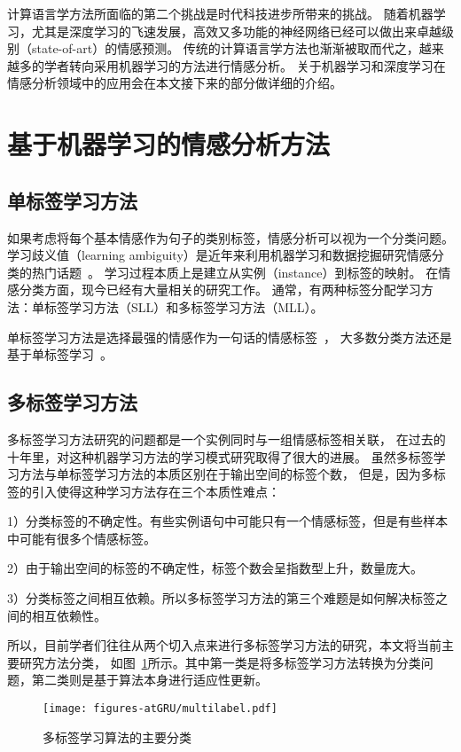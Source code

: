 计算语言学方法所面临的第二个挑战是时代科技进步所带来的挑战。
随着机器学习，尤其是深度学习的飞速发展，高效又多功能的神经网络已经可以做出来卓越级别（state-of-art）的情感预测。
传统的计算语言学方法也渐渐被取而代之，越来越多的学者转向采用机器学习的方法进行情感分析。
关于机器学习和深度学习在情感分析领域中的应用会在本文接下来的部分做详细的介绍。

\section{基于机器学习的情感分析方法}
\subsection{单标签学习方法}
如果考虑将每个基本情感作为句子的类别标签，情感分析可以视为一个分类问题。
学习歧义值（learning ambiguity）是近年来利用机器学习和数据挖掘研究情感分类的热门话题~。
学习过程本质上是建立从实例（instance）到标签的映射。
在情感分类方面，现今已经有大量相关的研究工作。
通常，有两种标签分配学习方法：单标签学习方法（SLL）和多标签学习方法（MLL）。

单标签学习方法是选择最强的情感作为一句话的情感标签~，
大多数分类方法还是基于单标签学习~。

\subsection{多标签学习方法}
多标签学习方法研究的问题都是一个实例同时与一组情感标签相关联，
在过去的十年里，对这种机器学习方法的学习模式研究取得了很大的进展。
虽然多标签学习方法与单标签学习方法的本质区别在于输出空间的标签个数，
但是，因为多标签的引入使得这种学习方法存在三个本质性难点：

1）分类标签的不确定性。有些实例语句中可能只有一个情感标签，但是有些样本中可能有很多个情感标签。

2）由于输出空间的标签的不确定性，标签个数会呈指数型上升，数量庞大。

3）分类标签之间相互依赖。所以多标签学习方法的第三个难题是如何解决标签之间的相互依赖性。

所以，目前学者们往往从两个切入点来进行多标签学习方法的研究，本文将当前主要研究方法分类，
如图~\ref{fig:multilabel}所示。其中第一类是将多标签学习方法转换为分类问题，第二类则是基于算法本身进行适应性更新。

\begin{figure}[h]
	\centering
	\texttt{[image: figures-atGRU/multilabel.pdf]}
	\caption{多标签学习算法的主要分类}
	\label{fig:multilabel}
\end{figure}

